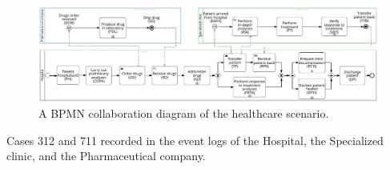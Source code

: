 \begin{figure}[t]
\centering
\includegraphics[width=\linewidth]{content/figures/bpmnHealthcare2.pdf}
\caption{A BPMN collaboration diagram of the healthcare scenario.}
\label{fig:BPMN_Healthcare}
\end{figure}
\begin{table}[t]%
  \caption{Cases 312 and 711 recorded in the event logs of the Hospital, the Specialized clinic, and the Pharmaceutical company.}
 \centering


\end{table}

